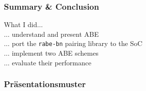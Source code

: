 \begin{frame}
    \frametitle{Summary \& Conclusion}
    What I did$\dots$\\
    $\dots$ understand and present ABE\\
    $\dots$ port the \texttt{rabe-bn} pairing library to the SoC\\
    $\dots$ implement two ABE schemes\\
    $\dots$ evaluate their performance\\
    

\end{frame}



\PraesentationStartseiteFlaggen



\PraesentationTitelseite %


\begin{frame}
\end{frame}

\PraesentationMasterWeissSchwarz

\begin{frame}
    \frametitle{Präsentationsmuster}
\end{frame}



